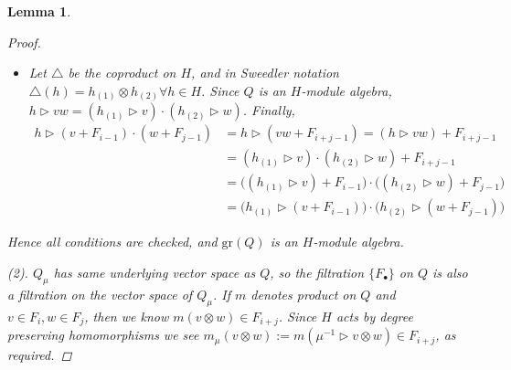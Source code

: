 \documentclass[10pt]{article}
\newcommand{\bb}{\medbreak}
\newcommand{\nt}{\noindent}
\newcommand{\cd}{\cdot}
\newcommand{\gr}{\text{gr}}
\newtheorem{lemma}{Lemma}[section]
\theoremstyle{definition}
\begin{document}
\begin{lemma}
\begin{proof}
\begin{itemize}
  \item Let $\triangle$ be the coproduct on $H$, and in Sweedler notation $\triangle(h)=h_{(1)}\otimes h_{(2)} \forall h\in H$. Since $Q$ is an $H$-module algebra, $h\rhd vw=(h_{(1)}\rhd v)\cd (h_{(2)}\rhd w)$. Finally,
  \begin{align*}
  h\rhd (v+F_{i-1})\cd (w+F_{j-1}) & = h\rhd (vw+F_{i+j-1})= (h\rhd vw)+F_{i+j-1}\\
    & =(h_{(1)}\rhd v)\cd (h_{(2)}\rhd w)+F_{i+j-1}\\
    & =\bigg((h_{(1)}\rhd v)+F_{i-1} \bigg)\cd \bigg((h_{(2)}\rhd w)+F_{j-1} \bigg)\\
    & = \bigg(h_{(1)}\rhd (v+F_{i-1})\bigg)\cd \bigg(h_{(2)}\rhd (w+F_{j-1})\bigg)
  \end{align*} 
\end{itemize}
\nt Hence all conditions are checked, and $\gr(Q)$ is an $H$-module algebra.\bb

\nt (2). $Q_\mu$ has same underlying vector space as $Q$, so the filtration $\{F_\bullet\}$ on $Q$ is also a filtration on the vector space of $Q_\mu$. If $m$ denotes product on $Q$ and $v\in F_i,w\in F_j$, then we know $m(v\otimes w)\in F_{i+j}$. Since $H$ acts by degree preserving homomorphisms we see $m_\mu(v\otimes w):=m(\mu^{-1}\rhd v\otimes w)\in F_{i+j}$, as required.
\end{proof}
\end{lemma}

\end{document}
